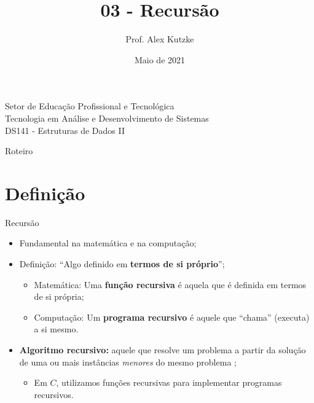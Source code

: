 \documentclass{beamer}
\title{03 - Recursão}
\author{Prof. Alex Kutzke}
\date{Maio de 2021}
\begin{document}
	\begin{frame}
		\begin{center}
			\large{Setor de Educação Profissional e Tecnológica}\\
			Tecnologia em Análise e Desenvolvimento de Sistemas\\
			\vspace{1cm}			
			\small{DS141 - Estruturas de Dados II}
		\end{center}
		\titlepage
	\end{frame}

	\begin{frame}[c]{Roteiro}
		\tableofcontents
	\end{frame}

	\section{Definição}

  \begin{frame}[c]{Recursão}
  	\begin{itemize}
  		\item Fundamental na matemática e na computação;

			\item Definição: ``Algo definido em \textbf{termos de si próprio}'';

			\begin{itemize}
				\item Matemática: Uma \textbf{função recursiva} é aquela que é definida em termos de si própria;
				\item Computação: Um \textbf{programa recursivo} é aquele que ``chama'' (executa) a si mesmo.
			\end{itemize}

			\item \textbf{Algoritmo recursivo:} aquele que resolve um problema a partir da solução de uma ou mais instâncias \textit{menores} do mesmo problema \cite{sedgewick2014algorithms};
			\begin{itemize}
				\item Em $C$, utilizamos funções recursivas para implementar programas recursivos.
			\end{itemize}
  	\end{itemize}
  \end{frame}
\end{document}
